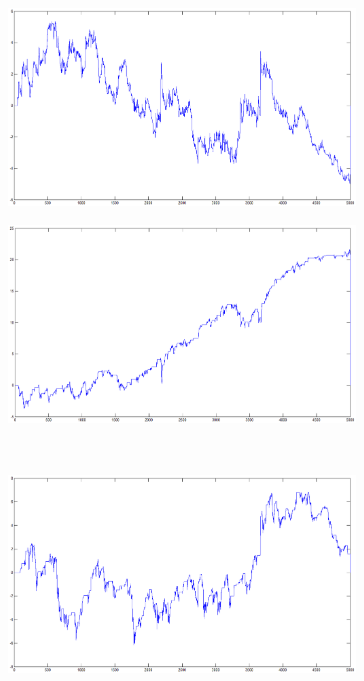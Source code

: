 \documentclass{tewiart}
\begin{document}
\FloatBarrier
\begin{figure}[h]
\centering
\begin{minipage}{.49\linewidth}
\centering
\includegraphics[width=0.82\textwidth]{images/eurjpyA.eps}
\label{jedno}
\end{minipage}
\begin{minipage}{.49\linewidth}
\centering
\includegraphics[width=0.82\textwidth]{images/eurjpyB.eps}
\label{dwu}
\end{minipage}
\\
\begin{minipage}{.49\linewidth}
\centering
\includegraphics[width=0.82\textwidth]{images/eurjpyC.eps}
\label{cztero}

\end{minipage}
\end{figure}
\end{document}
